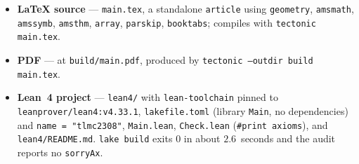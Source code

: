 \documentclass[11pt]{article}
\theoremstyle{definition}
\theoremstyle{remark}
\begin{document}
\begin{itemize}
\item \textbf{LaTeX source} --- \texttt{main.tex}, a standalone \texttt{article}
  using \texttt{geometry}, \texttt{amsmath}, \texttt{amssymb}, \texttt{amsthm},
  \texttt{array}, \texttt{parskip}, \texttt{booktabs}; compiles with
  \texttt{tectonic main.tex}.
\item \textbf{PDF} --- at \texttt{build/main.pdf}, produced by
  \texttt{tectonic --outdir build main.tex}.
\item \textbf{Lean~4 project} --- \texttt{lean4/} with \texttt{lean-toolchain}
  pinned to \texttt{leanprover/lean4:v4.33.1}, \texttt{lakefile.toml}
  (library \texttt{Main}, no dependencies) and \texttt{name = "tlmc2308"},
  \texttt{Main.lean}, \texttt{Check.lean} (\texttt{\#print axioms}), and
  \texttt{lean4/README.md}. \texttt{lake build} exits $0$ in about $2.6$~seconds
  and the audit reports no \texttt{sorryAx}.
\end{itemize}
\end{document}
